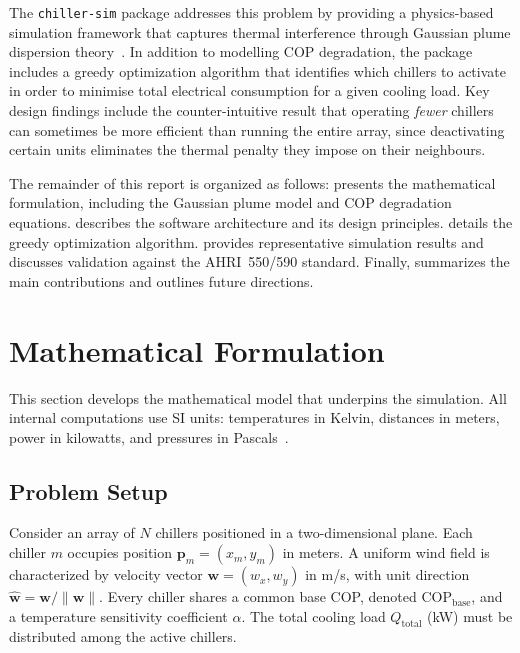 \documentclass[11pt, a4paper]{article}
\newcommand{\cop}{\mathrm{COP}}
\newcommand{\copbase}{\cop_{\mathrm{base}}}
\newcommand{\vwind}{\mathbf{w}}
\begin{document}
The \texttt{chiller-sim} package addresses this problem by providing a physics-based simulation framework that captures thermal interference through Gaussian plume dispersion theory~\cite{pasquill1961estimation, gifford1961turbulent}.
In addition to modelling COP degradation, the package includes a greedy optimization algorithm that identifies which chillers to activate in order to minimise total electrical consumption for a given cooling load.
Key design findings include the counter-intuitive result that operating \emph{fewer} chillers can sometimes be more efficient than running the entire array, since deactivating certain units eliminates the thermal penalty they impose on their neighbours.

The remainder of this report is organized as follows:
 presents the mathematical formulation, including the Gaussian plume model and COP degradation equations.
 describes the software architecture and its design principles.
 details the greedy optimization algorithm.
 provides representative simulation results and discusses validation against the AHRI~550/590 standard.
Finally,  summarizes the main contributions and outlines future directions.

\section{Mathematical Formulation}
\label{sec:mathematical-formulation}

This section develops the mathematical model that underpins the simulation.
All internal computations use SI units: temperatures in Kelvin, distances in meters, power in kilowatts, and pressures in Pascals~\cite{ashrae2021fundamentals}.

\subsection{Problem Setup}
\label{sec:problem-setup}

Consider an array of $N$ chillers positioned in a two-dimensional plane.
Each chiller $m$ occupies position $\mathbf{p}_m = (x_m, y_m)$ in meters.
A uniform wind field is characterized by velocity vector $\vwind = (w_x, w_y)$ in m/s, with unit direction $\hat{\vwind} = \vwind / \|\vwind\|$.
Every chiller shares a common base COP, denoted $\copbase$, and a temperature sensitivity coefficient $\alpha$.
The total cooling load $Q_{\mathrm{total}}$ (kW) must be distributed among the active chillers.
\end{document}

